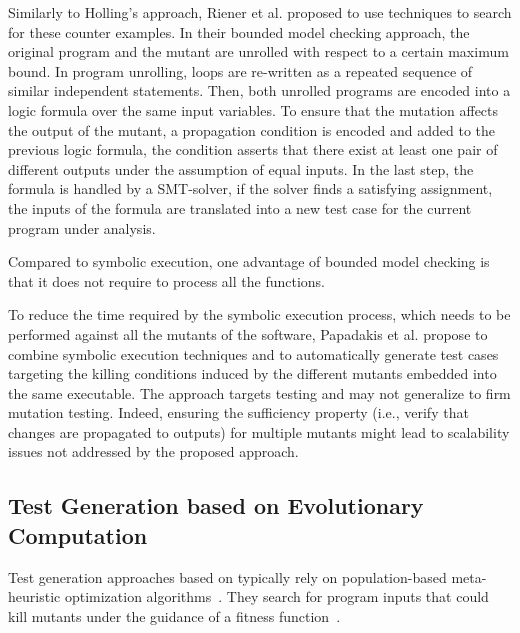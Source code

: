 Similarly to Holling's approach, Riener et al. \cite{riener2011test} proposed to use  techniques to search for these counter examples.
In their bounded model checking approach, the original program and the mutant are unrolled with respect to a certain maximum bound. In program unrolling, loops are re-written as a repeated sequence of similar independent statements. Then, both unrolled programs are encoded into a logic formula over the same input variables. To ensure that the mutation affects the output of the mutant, a propagation condition is encoded and added to the previous logic formula, the condition asserts that there exist at least one pair of different outputs under the assumption of equal inputs. In the last step, the formula is handled by a SMT-solver, if the solver finds a satisfying assignment, the inputs of the formula are translated into a new test case for the current program under analysis.


Compared to symbolic execution, one advantage of bounded model checking is that it does not require to process all the functions.

To reduce the time required by the symbolic execution process, which needs to be performed against all the mutants of the software, Papadakis et al. \cite{papadakis2011automatically, papadakis2010towards} propose to combine symbolic execution techniques and  to automatically generate test cases targeting the killing conditions induced by the different mutants embedded into the same executable. The approach targets  testing and may not generalize to firm mutation testing. Indeed, ensuring the sufficiency property (i.e., verify that changes are propagated to outputs) for multiple mutants might lead to scalability issues not addressed by the proposed approach.

\subsection{Test Generation based on Evolutionary Computation}

Test generation approaches based on  typically rely on population-based meta-heuristic optimization algorithms~\cite{harman2011strong}. 
They search for program inputs that could kill mutants under the guidance of a fitness function~\cite{harman2011strong}. 


